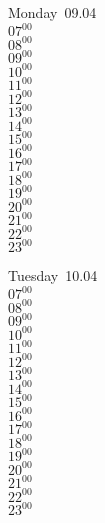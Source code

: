 \documentclass[11pt, a4paper]{book}\usepackage[]{graphicx}\usepackage[]{color}
\begin{document}
\begin{headerbox}
\end{headerbox}
\begin{weekdaybox}
  Monday~09.04\\
  { 
  \vfill
  $07^{00}$\\
$08^{00}$\\
$09^{00}$\\
$10^{00}$\\
$11^{00}$\\
$12^{00}$\\
$13^{00}$\\
$14^{00}$\\
$15^{00}$\\
$16^{00}$\\
$17^{00}$\\
$18^{00}$\\
$19^{00}$\\
$20^{00}$\\
$21^{00}$\\
$22^{00}$\\
$23^{00}$\\
  }
\end{weekdaybox}
\begin{weekdaybox}
  Tuesday~10.04\\
  { 
  \vfill
  $07^{00}$\\
$08^{00}$\\
$09^{00}$\\
$10^{00}$\\
$11^{00}$\\
$12^{00}$\\
$13^{00}$\\
$14^{00}$\\
$15^{00}$\\
$16^{00}$\\
$17^{00}$\\
$18^{00}$\\
$19^{00}$\\
$20^{00}$\\
$21^{00}$\\
$22^{00}$\\
$23^{00}$\\
  }
\end{weekdaybox}
\end{document}
